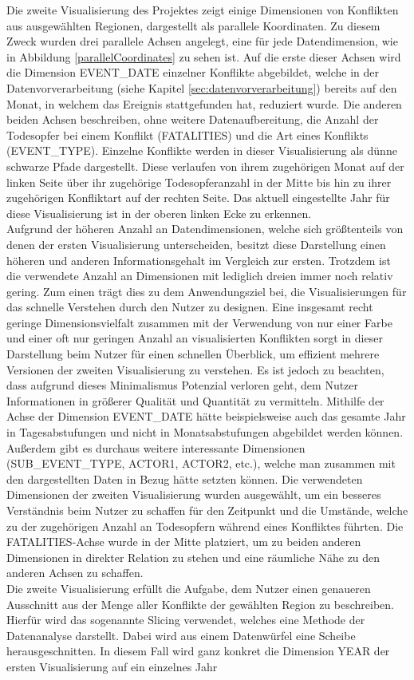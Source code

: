 \documentclass[usegeometry=true]{scrartcl}
\begin{document}
Die zweite Visualisierung des Projektes zeigt einige Dimensionen von Konflikten aus ausgewählten Regionen, dargestellt als parallele Koordinaten. Zu diesem Zweck wurden drei parallele Achsen angelegt, eine für jede Datendimension, wie in Abbildung \ref{parallelCoordinates} zu sehen ist. Auf die erste dieser Achsen wird die Dimension EVENT\_DATE einzelner Konflikte abgebildet, welche in der Datenvorverarbeitung (siehe Kapitel \ref{sec:datenvorverarbeitung}) bereits auf den Monat, in welchem das Ereignis stattgefunden hat, reduziert wurde. Die anderen beiden Achsen beschreiben, ohne weitere Datenaufbereitung, die Anzahl der Todesopfer bei einem Konflikt (FATALITIES) und die Art eines Konflikts (EVENT\_TYPE). Einzelne Konflikte werden in dieser Visualisierung als dünne schwarze Pfade dargestellt. Diese verlaufen von ihrem zugehörigen Monat auf der linken Seite über ihr zugehörige Todesopferanzahl in der Mitte bis hin zu ihrer zugehörigen Konfliktart auf der rechten Seite. Das aktuell eingestellte Jahr für diese Visualisierung ist in der oberen linken Ecke zu erkennen.\\ Aufgrund der höheren Anzahl an Datendimensionen, welche sich größtenteils von denen der ersten Visualisierung unterscheiden, besitzt diese Darstellung einen höheren und anderen Informationsgehalt im Vergleich zur ersten. Trotzdem ist die verwendete Anzahl an Dimensionen mit lediglich dreien immer noch relativ gering. Zum einen trägt dies zu dem Anwendungsziel bei, die Visualisierungen für das schnelle Verstehen durch den Nutzer zu designen. Eine insgesamt recht geringe Dimensionsvielfalt zusammen mit der Verwendung von nur einer Farbe und einer oft nur geringen Anzahl an visualisierten Konflikten sorgt in dieser Darstellung beim Nutzer für einen schnellen Überblick, um effizient mehrere Versionen der zweiten Visualisierung zu verstehen. Es ist jedoch zu beachten, dass aufgrund dieses Minimalismus Potenzial verloren geht, dem Nutzer Informationen in größerer Qualität und Quantität zu vermitteln. Mithilfe der Achse der Dimension EVENT\_DATE hätte beispielsweise auch das gesamte Jahr in Tagesabstufungen und nicht in Monatsabstufungen abgebildet werden können. Außerdem gibt es durchaus weitere interessante Dimensionen (SUB\_EVENT\_TYPE, ACTOR1, ACTOR2, etc.), welche man zusammen mit den dargestellten Daten in Bezug hätte setzten können. Die verwendeten Dimensionen der zweiten Visualisierung wurden ausgewählt, um ein besseres Verständnis beim Nutzer zu schaffen für den Zeitpunkt und die Umstände, welche zu der zugehörigen Anzahl an Todesopfern während eines Konfliktes führten. Die FATALITIES-Achse wurde in der Mitte platziert, um zu beiden anderen Dimensionen in direkter Relation zu stehen und eine räumliche Nähe zu den anderen Achsen zu schaffen.\\ Die zweite Visualisierung erfüllt die Aufgabe, dem Nutzer einen genaueren Ausschnitt aus der Menge aller Konflikte der gewählten Region zu beschreiben. Hierfür wird das sogenannte \glqq Slicing\grqq{} verwendet, welches eine Methode der Datenanalyse darstellt. Dabei wird aus einem Datenwürfel eine Scheibe \glqq herausgeschnitten\grqq. In diesem Fall wird ganz konkret die Dimension YEAR der ersten Visualisierung auf ein einzelnes Jahr 
\end{document}
